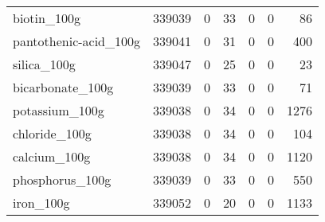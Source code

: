 \begin{tabular}{lrrrrrr}
biotin\_100g                                &                                        339039 &                                         0 &                                            33 &                                         0 &                      0 &               86 \\
pantothenic-acid\_100g                      &                                        339041 &                                         0 &                                            31 &                                         0 &                      0 &              400 \\
silica\_100g                                &                                        339047 &                                         0 &                                            25 &                                         0 &                      0 &               23 \\
bicarbonate\_100g                           &                                        339039 &                                         0 &                                            33 &                                         0 &                      0 &               71 \\
potassium\_100g                             &                                        339038 &                                         0 &                                            34 &                                         0 &                      0 &             1276 \\
chloride\_100g                              &                                        339038 &                                         0 &                                            34 &                                         0 &                      0 &              104 \\
calcium\_100g                               &                                        339038 &                                         0 &                                            34 &                                         0 &                      0 &             1120 \\
phosphorus\_100g                            &                                        339039 &                                         0 &                                            33 &                                         0 &                      0 &              550 \\
iron\_100g                                  &                                        339052 &                                         0 &                                            20 &                                         0 &                      0 &             1133 \\

\end{tabular}

